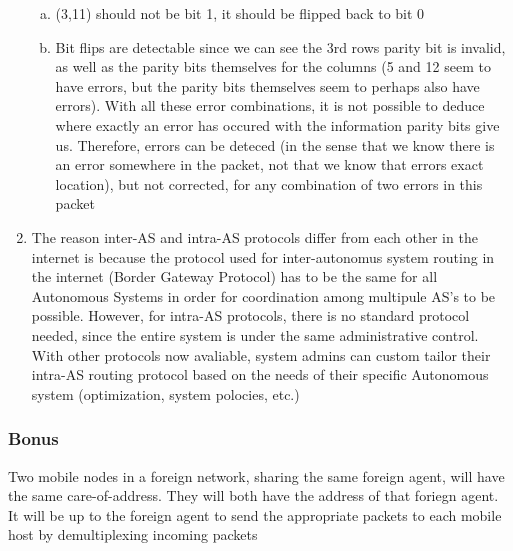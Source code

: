 \documentclass[14pt]{article}
\begin{document}
\begin{enumerate}
\begin{enumerate}[(a)]
\item
(3,11) should not be bit 1, it should be flipped back to bit 0 \\

\item
Bit flips are detectable since we can see the 3rd rows parity bit is invalid, as well as the parity bits themselves for the columns (5 and 12 seem to have errors, but the parity bits themselves seem to perhaps also have errors). With all these error combinations, it is not possible to deduce where exactly an error has occured with the information parity bits give us. Therefore, errors can be deteced (in the sense that we know there is an error somewhere in the packet, not that we know that errors exact location), but not corrected, for any combination of two errors in this packet
\end{enumerate}
\item
The reason inter-AS and intra-AS protocols differ from each other in the internet is because the protocol used for inter-autonomus system routing in the internet (Border Gateway Protocol) has to be the same for all Autonomous Systems in order for coordination among multipule AS's to be possible. However, for intra-AS protocols, there is no standard protocol needed, since the entire system is under the same administrative control. With other protocols now avaliable, system admins can custom tailor their intra-AS routing protocol based on the needs of their specific Autonomous system (optimization, system polocies, etc.) 
\end{enumerate}

\subsubsection*{Bonus}
Two mobile nodes in a foreign network, sharing the same foreign agent, will have the same care-of-address. They will both have the address of that foriegn agent. It will be up to the foreign agent to send the appropriate packets to each mobile host by demultiplexing incoming packets
\end{document}
